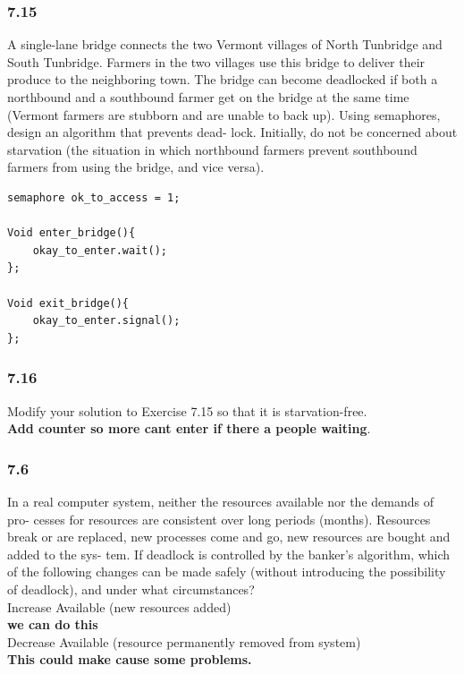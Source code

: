 \documentclass[a4paper,10pt,titlepage]{report}
\begin{document}
\subsubsection{7.15} 
A single-lane bridge connects the two Vermont villages of North Tunbridge and South Tunbridge. Farmers in the two villages use this bridge to deliver their produce to the neighboring town. The bridge can become deadlocked if both a northbound and a southbound farmer get on the bridge at the same time (Vermont farmers are stubborn and are unable to back up). Using semaphores, design an algorithm that prevents dead- lock. Initially, do not be concerned about starvation (the situation in which northbound farmers prevent southbound farmers from using the bridge, and vice versa).\\
\begin{lstlisting}
semaphore ok_to_access = 1;

Void enter_bridge(){
	okay_to_enter.wait();
};

Void exit_bridge(){
	okay_to_enter.signal();
};

\end{lstlisting}


\subsubsection{7.16} Modify your solution to Exercise 7.15 so that it is starvation-free.\\
\textbf{Add counter so more cant enter if there a people waiting}. \\




\subsubsection{7.6} In a real computer system, neither the resources available nor the demands of pro- cesses for resources are consistent over long periods (months). Resources break or are replaced, new processes come and go, new resources are bought and added to the sys- tem. If deadlock is controlled by the banker's algorithm, which of the following changes can be made safely (without introducing the possibility of deadlock), and under what circumstances?\\

Increase Available (new resources added)\\
\textbf{we can do this} \\
Decrease Available (resource permanently removed from system)\\
\textbf{This could make cause some problems.}\\
\end{document}
